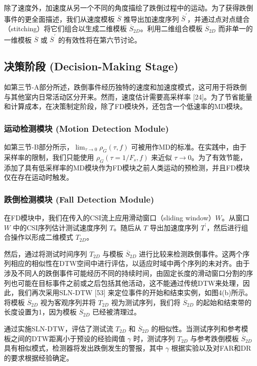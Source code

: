 \documentclass[journal]{IEEEtran}
\begin{document}
除了速度外，加速度从另一个不同的角度描绘了跌倒过程中的运动。为了获得跌倒事件的更全面描述，我们从速度模板 $\overline{S}$ 推导出加速度序列 $\overline{S}^{\prime}$，并通过点对点缝合（stitching）将它们组合以生成二维模板 $\overline{S}_{2D}$。利用二维组合模板 $\overline{S}_{2D}$ 而非单一的一维模板 $\overline{S}$ 或 $\overline{S}^{\prime}$ 的有效性将在第六节讨论。

\subsection{决策阶段 (Decision-Making Stage)}
如第三节-A部分所述，跌倒事件经历独特的速度和加速度模式，这可用于将跌倒与其他室内日常活动区分开来。然而，速度估计需要高采样率 [24]。为了节省能量和计算成本，在决策制定阶段，除了FD模块外，还包含一个低速率的MD模块。

\subsubsection{运动检测模块 (Motion Detection Module)}
如第三节-B部分所示，$\lim_{\tau \rightarrow 0}\rho_{G}(\tau,f)$ 可被用作MD的标准。在实践中，由于采样率的限制，我们只能使用 $\rho_{G}(\tau=1/F_{s},f)$ 来近似 $\tau \rightarrow 0$。为了有效节能，添加了具有低采样率的MD模块作为FD模块之前人类运动的预检测，并且FD模块仅在存在运动时触发。

\subsubsection{跌倒检测模块 (Fall Detection Module)}
在FD模块中，我们在传入的CSI流上应用滑动窗口（sliding window）$W$。从窗口 $W$ 中的CSI序列估计测试速度序列 $T$。随后从 $T$ 导出加速度序列 $T^{\prime}$，然后进行组合操作以形成二维模式 $T_{2D}$。

然后，通过将测试时间序列 $T_{2D}$ 与模板 $\overline{S}_{2D}$ 进行比较来检测跌倒事件。这两个序列相应的相似性在DTW空间中进行评估，以适应时域中两个序列的未对齐。由于涉及不同人的跌倒事件可能经历不同的持续时间，由固定长度的滑动窗口分割的序列也可能在目标事件之前或之后包括其他活动，这不能通过传统DTW来处理，因此，我们再次采用SLN-DTW [53] 来定位事件的开始和结束实例，如图4(b)所示。将模板 $\overline{S}_{2D}$ 视为客观序列并将 $T_{2D}$ 视为测试序列，我们将 $\overline{S}_{2D}$ 的起始和结束带的长度设置为1，因为模板 $\overline{S}_{2D}$ 已经被清理过。

通过实施SLN-DTW，评估了测试流 $T_{2D}$ 和 $\overline{S}_{2D}$ 的相似性。当测试序列和参考模板之间的DTW距离小于预设的经验阈值 $\gamma$ 时，测试序列 $T_{2D}$ 与参考跌倒模板 $\overline{S}_{2D}$ 具有相似模式，检测器将发出跌倒发生的警报，其中 $\gamma$ 根据实验以及对FAR和DR的要求根据经验确定。
\end{document}
